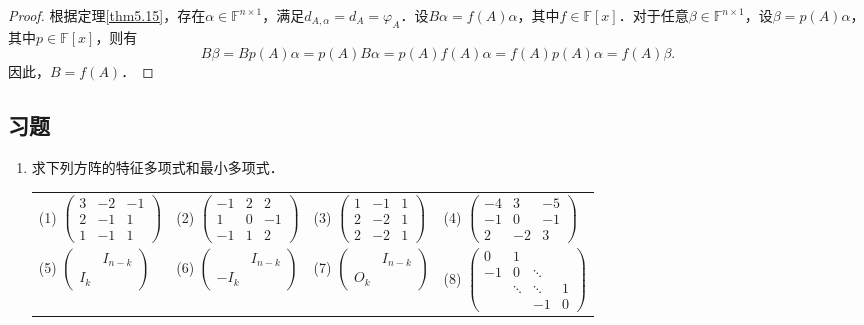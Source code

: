 \documentclass[a4paper,fontset=windows]{ctexbook}
\theoremstyle{definition}
\begin{document}
\begin{proof}
根据定理\ref{thm5.15}，存在$\alpha\in\mathbb{F}^{n\times 1}$，满足$d_{A,\alpha}=d_A=\varphi_A$．设$B\alpha=f(A)\alpha$，其中$f\in\mathbb{F}[x]$．\linebreak 对于任意$\beta\in\mathbb{F}^{n\times 1}$，设$\beta=p(A)\alpha$，其中$p\in\mathbb{F}[x]$，则有
$$B\beta=Bp(A)\alpha=p(A)B\alpha=p(A)f(A)\alpha=f(A)p(A)\alpha=f(A)\beta.$$
因此，$B=f(A)$．
\end{proof}

\subsection*{习题}

\begin{enumerate}
\item 求下列方阵的特征多项式和最小多项式．

\hspace*{-6pt}\begin{tabular}{llll}
(1) $\begin{pmatrix}3&-2&-1 \\ 2&-1&1 \\ 1&-1&1\end{pmatrix}$ &
(2) $\begin{pmatrix}-1&2&2 \\ 1&0&-1 \\ -1&1&2\end{pmatrix}$ &
(3) $\begin{pmatrix}1&-1&1 \\ 2&-2&1 \\ 2&-2&1\end{pmatrix}$ &
(4) $\begin{pmatrix}-4&3&-5 \\ -1&0&-1 \\ 2&-2&3\end{pmatrix}$ \\
(5) $\begin{pmatrix}&I_{n-k} \\ I_k&\end{pmatrix}$ &
(6) $\begin{pmatrix}&I_{n-k} \\ -I_k&\end{pmatrix}$ &
(7) $\begin{pmatrix}&I_{n-k} \\ O_k&\end{pmatrix}$ &
(8) $\begin{pmatrix}0&1&& \\ -1&0&\ddots& \\ &\ddots&\ddots&1 \\ &&-1&0\end{pmatrix}$\end{tabular}


\end{enumerate}
\end{document}

